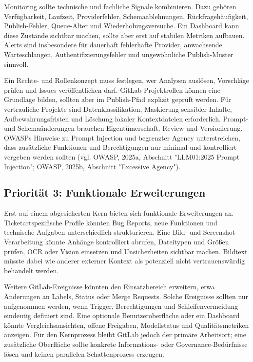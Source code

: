 Monitoring sollte technische und fachliche Signale kombinieren. Dazu gehören Verfügbarkeit, Laufzeit, Providerfehler, Schemaablehnungen, Rückfragehäufigkeit, Publish-Fehler, Queue-Alter und Wiederholungsversuche. Ein Dashboard kann diese Zustände sichtbar machen, sollte aber erst auf stabilen Metriken aufbauen. Alerts sind insbesondere für dauerhaft fehlerhafte Provider, anwachsende Warteschlangen, Authentifizierungsfehler und ungewöhnliche Publish-Muster sinnvoll.

Ein Rechte- und Rollenkonzept muss festlegen, wer Analysen auslösen, Vorschläge prüfen und Issues veröffentlichen darf. GitLab-Projektrollen können eine Grundlage bilden, sollten aber im Publish-Pfad explizit geprüft werden. Für vertrauliche Projekte sind Datenklassifikation, Maskierung sensibler Inhalte, Aufbewahrungsfristen und Löschung lokaler Kontextdateien erforderlich. Prompt- und Schemaänderungen brauchen Eigentümerschaft, Review und Versionierung. OWASPs Hinweise zu Prompt Injection und begrenzter Agency unterstreichen, dass zusätzliche Funktionen und Berechtigungen nur minimal und kontrolliert vergeben werden sollten (vgl. OWASP, 2025a, Abschnitt "LLM01:2025 Prompt Injection"; OWASP, 2025b, Abschnitt "Excessive Agency").

\subsection{Priorität 3: Funktionale Erweiterungen}

Erst auf einem abgesicherten Kern bieten sich funktionale Erweiterungen an. Ticketartspezifische Profile könnten Bug Reports, neue Funktionen und technische Aufgaben unterschiedlich strukturieren. Eine Bild- und Screenshot-Verarbeitung könnte Anhänge kontrolliert abrufen, Dateitypen und Größen prüfen, OCR oder Vision einsetzen und Unsicherheiten sichtbar machen. Bildtext müsste dabei wie anderer externer Kontext als potenziell nicht vertrauenswürdig behandelt werden.

Weitere GitLab-Ereignisse könnten den Einsatzbereich erweitern, etwa Änderungen an Labels, Status oder Merge Requests. Solche Ereignisse sollten nur aufgenommen werden, wenn Trigger, Berechtigungen und Schleifenvermeidung eindeutig definiert sind. Eine optionale Benutzeroberfläche oder ein Dashboard könnte Vergleichsansichten, offene Freigaben, Modellstatus und Qualitätsmetriken anzeigen. Für den Kernprozess bleibt GitLab jedoch der primäre Arbeitsort; eine zusätzliche Oberfläche sollte konkrete Informations- oder Governance-Bedürfnisse lösen und keinen parallelen Schattenprozess erzeugen.

